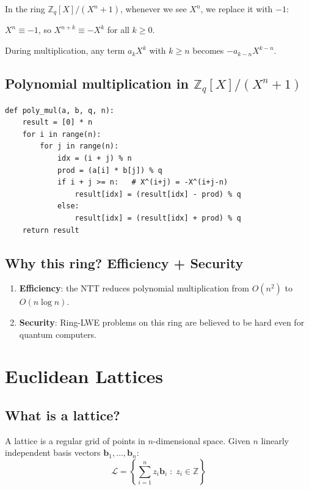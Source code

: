 \documentclass[11pt,a4paper]{article}
\begin{document}
In the ring $\mathbb{Z}_q[X]/(X^n+1)$, whenever we see $X^n$, we replace it with $-1$:

\begin{infobox}
$X^n \equiv -1$, so $X^{n+k} \equiv -X^k$ for all $k \geq 0$.
\end{infobox}

During multiplication, any term $a_k X^k$ with $k \geq n$ becomes $-a_{k-n} X^{k-n}$.

\subsection{Polynomial multiplication in $\mathbb{Z}_q[X]/(X^n+1)$}

\begin{lstlisting}[style=python]
def poly_mul(a, b, q, n):
    result = [0] * n
    for i in range(n):
        for j in range(n):
            idx = (i + j) % n
            prod = (a[i] * b[j]) % q
            if i + j >= n:   # X^(i+j) = -X^(i+j-n)
                result[idx] = (result[idx] - prod) % q
            else:
                result[idx] = (result[idx] + prod) % q
    return result
\end{lstlisting}

\subsection{Why this ring? Efficiency + Security}

\begin{enumerate}
  \item \textbf{Efficiency}: the NTT reduces polynomial multiplication from $O(n^2)$ to $O(n \log n)$.
  \item \textbf{Security}: Ring-LWE problems on this ring are believed to be hard even for quantum computers.
\end{enumerate}

\section{Euclidean Lattices}

\subsection{What is a lattice?}

A lattice is a regular grid of points in $n$-dimensional space. Given $n$ linearly independent basis vectors $\mathbf{b}_1, \ldots, \mathbf{b}_n$:
\[\mathcal{L} = \left\{ \sum_{i=1}^n z_i \mathbf{b}_i \; : \; z_i \in \mathbb{Z} \right\}\]
\end{document}
